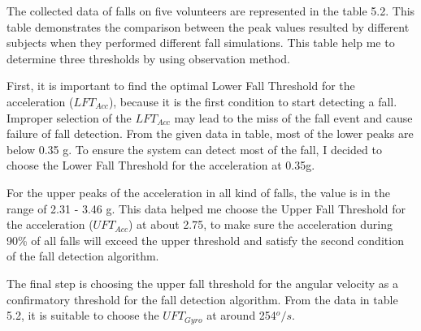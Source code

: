 \documentclass[letterpaper,12pt,titlepage,oneside,final]{book}
\begin{document}
The collected data of falls on five volunteers are represented in the table 5.2. This table demonstrates the comparison between the peak values resulted by different subjects when they performed different fall simulations. This table help me to determine three thresholds by using observation method.\par  
First, it is important to find the optimal Lower Fall Threshold for the acceleration ($LFT_{Acc}$), because it is the first condition to start detecting a fall. Improper selection of the $LFT_{Acc}$ may lead to the miss of the fall event and cause failure of fall detection. From the given data in table, most of the lower peaks are below 0.35 g. To ensure the system can detect most of the fall, I decided to choose the Lower Fall Threshold for the acceleration at 0.35g.
\par
For the upper peaks of the acceleration in all kind of falls, the value is in the range of 2.31 - 3.46 g. This data helped me choose the Upper Fall Threshold for the acceleration ($UFT_{Acc}$) at about 2.75, to make sure the acceleration during 90\% of all falls will exceed the upper threshold and satisfy the second condition of the fall detection algorithm. 
\par 
The final step is choosing the upper fall threshold for the angular velocity as a confirmatory threshold for the fall detection algorithm. From the data in table 5.2, it is suitable to choose the $UFT_{Gyro}$ at around 254$^{o}/s$.
\end{document}
